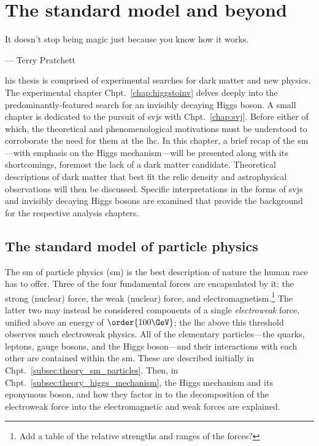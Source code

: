 \chapter{The standard model and beyond}
\label{chap:theory}

\epigraph{It doesn’t stop being magic just because you know how it works.}{--- Terry Pratchett}

his thesis is comprised of experimental searches for dark matter and new physics. The experimental chapter Chpt.~\ref{chap:higgstoinv} delves deeply into the predominantly-featured search for an invisibly decaying Higgs boson. A small chapter is dedicated to the pursuit of \glspl{svj} with Chpt.~\ref{chap:svj}. Before either of which, the theoretical and phenomenological motivations must be understood to corroborate the need for them at the \acrlong{lhc}. In this chapter, a brief recap of the \acrlong{sm}---with emphasis on the Higgs mechanism---will be presented along with its shortcomings, foremost the lack of a dark matter candidate. Theoretical descriptions of dark matter that best fit the relic density and astrophysical observations will then be discussed. Specific interpretations in the forms of \glspl{svj} and invisibly decaying Higgs bosons are examined that provide the background for the respective analysis chapters.




\section{The standard model of particle physics}
\label{sec:theory_standardmodel}


The \acrlong{sm} of particle physics (\acrshort{sm}) is the best description of nature the human race has to offer. Three of the four fundamental forces are encapsulated by it: the strong (nuclear) force, the weak (nuclear) force, and electromagnetism.\footnote{Add a table of the relative strengths and ranges of the forces?} The latter two may instead be considered components of a single \emph{electroweak} force, unified above an energy of $\order{\text{100}\GeV}$; the \acrshort{lhc} above this threshold observes much electroweak physics. All of the elementary particles---the quarks, leptons, gauge bosons, and the Higgs boson---and their interactions with each other are contained within the \acrlong{sm}. These are described initially in Chpt.~\ref{subsec:theory_sm_particles}. Then, in Chpt.~\ref{subsec:theory_higgs_mechanism}, the Higgs mechanism and its eponymous boson, and how they factor in to the decomposition of the electroweak force into the electromagnetic and weak forces are explained.


